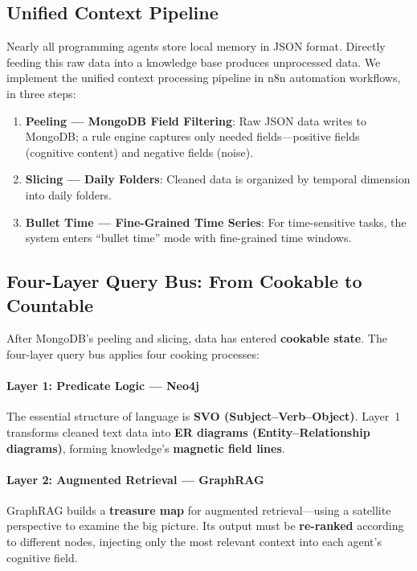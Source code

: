 \documentclass[11pt,a4paper]{article}
\begin{document}
\subsection{Unified Context Pipeline}
\label{sub:pipeline}

Nearly all programming agents store local memory in JSON format.
Directly feeding this raw data into a knowledge base produces unprocessed data.
We implement the unified context processing pipeline in n8n automation workflows, in three steps:

\begin{enumerate}
  \item \textbf{Peeling --- MongoDB Field Filtering}: Raw JSON data writes to MongoDB; a rule engine captures only needed fields---positive fields (cognitive content) and negative fields (noise).
  \item \textbf{Slicing --- Daily Folders}: Cleaned data is organized by temporal dimension into daily folders.
  \item \textbf{Bullet Time --- Fine-Grained Time Series}: For time-sensitive tasks, the system enters ``bullet time'' mode with fine-grained time windows.
\end{enumerate}

\subsection{Four-Layer Query Bus: From Cookable to Countable}
\label{sub:fourlayer}

After MongoDB's peeling and slicing, data has entered \textbf{cookable state}.
The four-layer query bus applies four cooking processes:

\paragraph{Layer 1: Predicate Logic --- Neo4j}
The essential structure of language is \textbf{SVO (Subject--Verb--Object)}.
Layer~1 transforms cleaned text data into \textbf{ER diagrams (Entity--Relationship diagrams)}, forming knowledge's \textbf{magnetic field lines}.

\paragraph{Layer 2: Augmented Retrieval --- GraphRAG}
GraphRAG builds a \textbf{treasure map} for augmented retrieval---using a satellite perspective to examine the big picture.
Its output must be \textbf{re-ranked} according to different nodes, injecting only the most relevant context into each agent's cognitive field.
\end{document}

